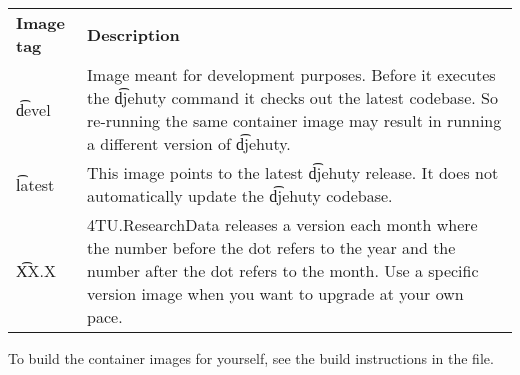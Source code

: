 \begin{tabularx}{\textwidth}{*{1}{!{\VRule[-1pt]}l}!{\VRule[-1pt]}X}
  \headrow
  \textbf{Image tag}  & \textbf{Description}\\
  \t{devel}           & Image meant for development purposes.  Before it
                        executes the \t{djehuty} command it checks out the
                        latest codebase.  So re-running the same container
                        image may result in running a different version of
                        \t{djehuty}.\\
  \t{latest}          & This image points to the latest \t{djehuty} release.
                        It does not automatically update the \t{djehuty}
                        codebase.\\
  \t{XX.X}            & 4TU.ResearchData releases a version each month where
                        the number before the dot refers to the year and the
                        number after the dot refers to the month.  Use a
                        specific version image when you want to upgrade at
                        your own pace.\\
\end{tabularx}

  To build the container images for yourself, see the build instructions in
  the  file.
